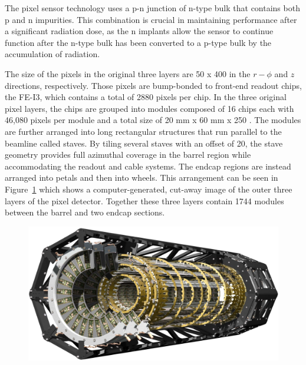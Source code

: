 The pixel sensor technology uses a p-n junction of n-type bulk that contains both p\tsup{+} and n\tsup{+} impurities.
This combination is crucial in maintaining performance after a significant radiation dose, as the n\tsup{+} implants allow the sensor to continue function after the n-type bulk has been converted to a p-type bulk by the accumulation of radiation.

The size of the pixels in the original three layers are 50 \um x 400 \um in the $r-\phi$ and $z$ directions, respectively.
Those pixels are bump-bonded to front-end readout chips, the FE-I3, which contains a total of 2880 pixels per chip. 
In the three original pixel layers, the chips are grouped into modules composed of 16 chips each with 46,080 pixels per module and a total size of 20 mm x 60 mm x 250 \um. 
The modules are further arranged into long rectangular structures that run parallel to the beamline called staves.
By tiling several staves with an offset of 20\textdegree, the stave geometry provides full azimuthal coverage in the barrel region while accommodating the readout and cable systems.
The endcap regions are instead arranged into petals and then into wheels. 
This arrangement can be seen in Figure~\ref{fig:pixel_overview} which shows a computer-generated, cut-away image of the outer three layers of the pixel detector.
Together these three layers contain 1744 modules between the barrel and two endcap sections.

\begin{figure}[hbtp]
\includegraphics[width=\fullfig]{figures/pixel_overview.pdf}
\caption{}
\label{fig:pixel_overview}
\end{figure}

